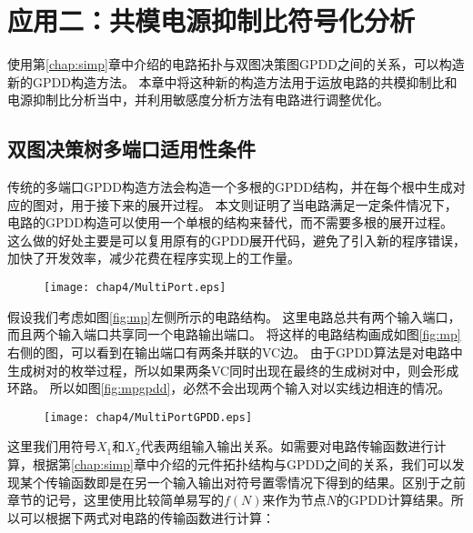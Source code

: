 \chapter{应用二：共模电源抑制比符号化分析}
\label{chap:cmps}

使用第\ref{chap:simp}章中介绍的电路拓扑与双图决策图GPDD之间的关系，可以构造新的GPDD构造方法。
本章中将这种新的构造方法用于运放电路的共模抑制比和电源抑制比分析当中，并利用敏感度分析方法有电路进行调整优化。

\section{双图决策树多端口适用性条件}
\label{sec:cmps:case}

传统的多端口GPDD构造方法会构造一个多根的GPDD结构，并在每个根中生成对应的图对，用于接下来的展开过程\parencite{GShi-GPDD-2013}。
本文则证明了当电路满足一定条件情况下，电路的GPDD构造可以使用一个单根的结构来替代，而不需要多根的展开过程。
这么做的好处主要是可以复用原有的GPDD展开代码，避免了引入新的程序错误，加快了开发效率，减少花费在程序实现上的工作量。

\begin{figure}[!htp]
	\centering
	\texttt{[image: chap4/MultiPort.eps]}
\end{figure}

假设我们考虑如图\ref{fig:mp}左侧所示的电路结构。
这里电路总共有两个输入端口，而且两个输入端口共享同一个电路输出端口。
将这样的电路结构画成如图\ref{fig:mp}右侧的图，可以看到在输出端口有两条并联的VC边。
由于GPDD算法是对电路中生成树对的枚举过程，所以如果两条VC同时出现在最终的生成树对中，则会形成环路。
所以如图\ref{fig:mpgpdd}，必然不会出现两个输入对以实线边相连的情况。

\begin{figure}[!htp]
	\centering
	\texttt{[image: chap4/MultiPortGPDD.eps]}
\end{figure}

这里我们用符号$X_1$和$X_2$代表两组输入输出关系。如需要对电路传输函数进行计算，根据第\ref{chap:simp}章中介绍的元件拓扑结构与GPDD之间的关系，我们可以发现某个传输函数即是在另一个输入输出对符号置零情况下得到的结果。区别于之前章节的记号，这里使用比较简单易写的$f\left( N \right)$来作为节点$N$的GPDD计算结果。所以可以根据下两式对电路的传输函数进行计算：

